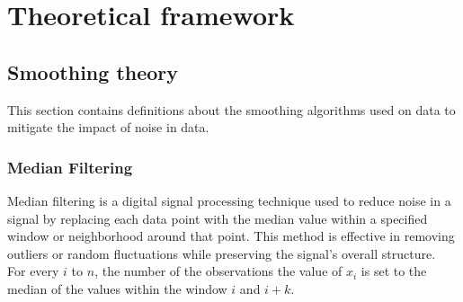 \chapter{Theoretical framework}
\label{sec:theoretical_framework}

\section{Smoothing theory}
This section contains definitions about the smoothing algorithms used on data to mitigate the impact of noise in data.

\subsection{Median Filtering}
Median filtering is a digital signal processing technique used to reduce noise in a signal by replacing each data point with the median value within a specified window or neighborhood around that point. 
This method is effective in removing outliers or random fluctuations while preserving the signal's overall structure.\\
For every $i$ to $n$, the number of the observations the value of $x_i$ is set to the median of the values within the window $i$ and $i+k$.

